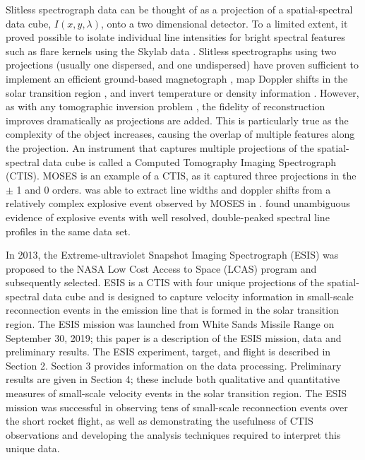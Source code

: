     Slitless spectrograph data can be thought of as a projection of a  spatial-spectral data cube, $I(x,y,\lambda)$, onto a two dimensional detector.  
     To a limited extent, it proved possible to isolate individual line intensities for bright spectral features such as flare kernels using the Skylab data \citep{TBD}. Slitless spectrographs using two projections (usually one dispersed, and one undispersed) have proven sufficient to implement an efficient ground-based magnetograph \citep{deforest2004}, map Doppler shifts in the solar transition region \citep{Courrier2018}, and invert temperature or density information \citep{winebarger2019}. 
    However, as with any tomographic inversion problem \citep{Kak_Slaney}, the fidelity of reconstruction improves dramatically as projections are added. This is particularly true as the complexity of the object increases, causing the overlap of multiple features along the projection. 
    An instrument that captures multiple projections of the spatial-spectral data cube is called a Computed Tomography Imaging Spectrograph (CTIS)\cite{Descour,Dereniak}.  MOSES is an example of a CTIS, as it captured three projections in the $\pm$ 1 and 0 orders.  \cite{Fox10} was able to extract line widths and doppler shifts from a relatively complex explosive event observed by MOSES in .  \cite{Rust2019} found unambiguous evidence of explosive events with well resolved, double-peaked spectral line profiles in the same data set.
    
    In 2013, the Extreme-ultraviolet Snapshot Imaging Spectrograph (ESIS) was proposed to the NASA Low Cost Access to Space (LCAS) program and subsequently selected.  
    ESIS is a CTIS with four unique projections of the spatial-spectral data cube and is designed to capture velocity information in small-scale reconnection events in the \ov emission line that is formed in the solar transition region.  
    The ESIS mission was launched from White Sands Missile Range on September 30,  2019; this paper is a description of the ESIS mission, data and preliminary results.  
    The ESIS experiment, target, and flight is described in Section 2.  
    Section 3 provides information on the data processing.  Preliminary results are given in Section 4; these include both qualitative and quantitative measures of small-scale velocity events in the solar transition region.  The ESIS mission was successful in  observing tens of small-scale reconnection events over the short rocket flight, as well as demonstrating the usefulness of CTIS observations and developing the analysis techniques required to interpret this unique data.


